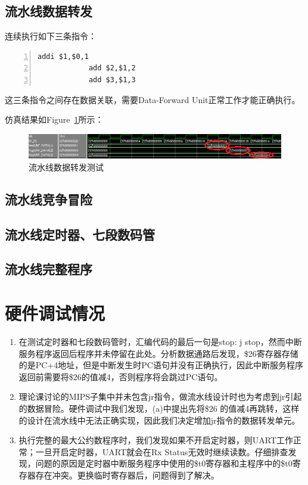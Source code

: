 \documentclass{article}
\begin{document}
        \subsection{流水线数据转发}
            连续执行如下三条指令：
            \begin{Verbatim}[frame=lines,numbers=left,stepnumber=5,label={test\_dataforward.asm}]
            addi $1,$0,1
            add $2,$1,2
            add $3,$1,3
            \end{Verbatim}
            这三条指令之间存在数据关联，需要Data-Forward Unit正常工作才能正确执行。
            
            仿真结果如Figure~\ref{fig:pipeline_dataforwardtest}所示：
            \begin{figure}[H]
                \centering
                \includegraphics[width=\textwidth]{images/pipeline_dataforwardtest.png}
                \caption{\label{fig:pipeline_dataforwardtest}流水线数据转发测试}
            \end{figure}
            
        \subsection{流水线竞争冒险}
            
            
        \subsection{流水线定时器、七段数码管}

        \subsection{流水线完整程序}


    \section{硬件调试情况}
        \begin{enumerate}
          \item 在测试定时器和七段数码管时，汇编代码的最后一句是stop: j stop，然而中断服务程序返回后程序并未停留在此处。分析数据通路后发现，\$26寄存器存储的是PC+4地址，但是中断发生时PC语句并没有正确执行，因此中断服务程序返回前需要将\$26的值减4，否则程序将会跳过PC语句。
          \item 理论课讨论的MIPS子集中并未包含jr指令，做流水线设计时也为考虑到jr引起的数据冒险。硬件调试中我们发现，(a)中提出先将\$26 的值减4再跳转，这样的设计在流水线中无法正确实现，因此我们决定增加jr指令的数据转发单元。
          \item 执行完整的最大公约数程序时，我们发现如果不开启定时器，则UART工作正常；一旦开启定时器，UART就会在Rx Status无效时继续读数。仔细排查发现，问题的原因是定时器中断服务程序中使用的\$t0寄存器和主程序中的\$t0寄存器存在冲突。更换临时寄存器后，问题得到了解决。
        \end{enumerate}
\end{document}
